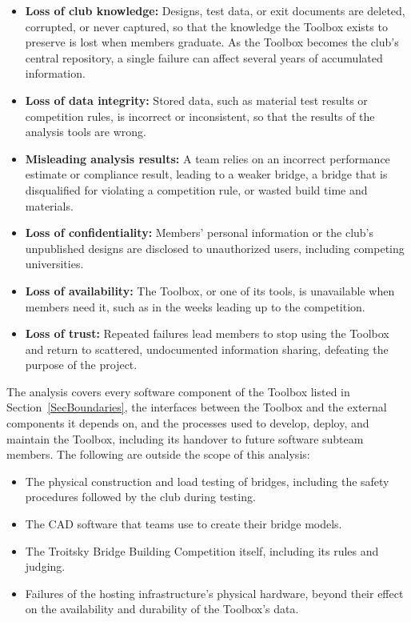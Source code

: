 \documentclass{article}
\begin{document}
\begin{itemize}
    \item \textbf{Loss of club knowledge:} Designs, test data, or exit documents
    are deleted, corrupted, or never captured, so that the knowledge the Toolbox
    exists to preserve is lost when members graduate. As the Toolbox becomes the
    club's central repository, a single failure can affect several years of
    accumulated information.
    \item \textbf{Loss of data integrity:} Stored data, such as material test
    results or competition rules, is incorrect or inconsistent, so that the
    results of the analysis tools are wrong.
    \item \textbf{Misleading analysis results:} A team relies on an incorrect
    performance estimate or compliance result, leading to a weaker bridge, a
    bridge that is disqualified for violating a competition rule, or wasted
    build time and materials.
    \item \textbf{Loss of confidentiality:} Members' personal information or the
    club's unpublished designs are disclosed to unauthorized users, including
    competing universities.
    \item \textbf{Loss of availability:} The Toolbox, or one of its tools, is
    unavailable when members need it, such as in the weeks leading up to the
    competition.
    \item \textbf{Loss of trust:} Repeated failures lead members to stop using
    the Toolbox and return to scattered, undocumented information sharing,
    defeating the purpose of the project.
\end{itemize}

The analysis covers every software component of the Toolbox listed in
Section~\ref{SecBoundaries}, the interfaces between the Toolbox and the
external components it depends on, and the processes used to develop, deploy,
and maintain the Toolbox, including its handover to future software subteam
members. The following are outside the scope of this analysis:

\begin{itemize}
    \item The physical construction and load testing of bridges, including the
    safety procedures followed by the club during testing.
    \item The CAD software that teams use to create their bridge models.
    \item The Troitsky Bridge Building Competition itself, including its rules
    and judging.
    \item Failures of the hosting infrastructure's physical hardware, beyond
    their effect on the availability and durability of the Toolbox's data.
\end{itemize}
\end{document}
